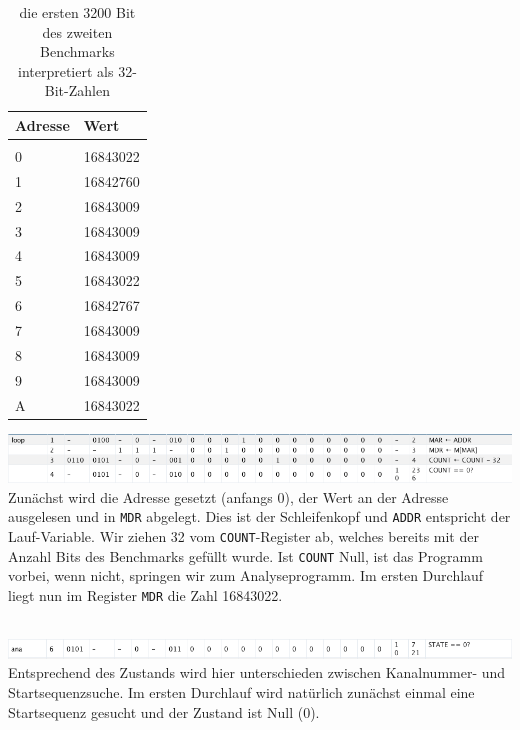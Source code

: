 \documentclass[12pt,titlepage]{article}
\begin{document}
\begin{table}[h!]
    \begin{tabular}{l|l}
    Adresse & Wert            \\
    \hline                    \\
    0     & 16843022  \\
    1     & 16842760  \\
    2     & 16843009  \\
    3     & 16843009  \\
    4     & 16843009  \\
    5     & 16843022  \\
    6     & 16842767  \\
    7     & 16843009  \\
    8     & 16843009  \\
    9     & 16843009  \\
    A     & 16843022  \\
    \end{tabular}
    \caption{die ersten 3200 Bit des zweiten Benchmarks interpretiert als 32-Bit-Zahlen}
\end{table}


\includegraphics[width=16cm]{listing/row1-4.png}
\leavevmode \\
Zunächst wird die Adresse gesetzt (anfangs 0), der Wert an der Adresse ausgelesen und in \texttt{MDR} abgelegt.
Dies ist der Schleifenkopf und \texttt{ADDR} entspricht der Lauf-Variable.
Wir ziehen 32 vom \texttt{COUNT}-Register ab, welches bereits mit der Anzahl Bits des Benchmarks gefüllt wurde.
Ist \texttt{COUNT} Null, ist das Programm vorbei, wenn nicht, springen wir zum Analyseprogramm.
Im ersten Durchlauf liegt nun im Register \texttt{MDR} die Zahl 16843022.

\leavevmode \\
\includegraphics[width=16cm]{listing/row6.png}
\leavevmode \\
Entsprechend des Zustands wird hier unterschieden zwischen Kanalnummer- und Startsequenzsuche. Im ersten Durchlauf
wird natürlich zunächst einmal eine Startsequenz gesucht und der Zustand ist Null (0).
\end{document}
